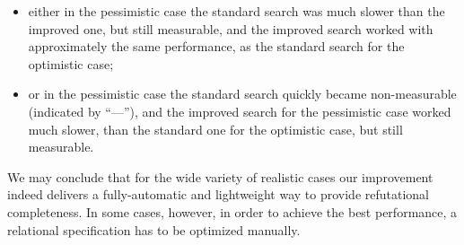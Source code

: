 \begin{itemize}
\item either in the pessimistic case the standard search was much slower than the improved one, but still measurable,
and the improved search worked with approximately the same performance, as the standard search for the optimistic case;
  
\item or in the pessimistic case the standard search quickly became non-measurable (indicated by ``---''), and the improved
search for the pessimistic case worked much slower, than the standard one for the optimistic case, but still measurable.
\end{itemize}

We may conclude that for the wide variety of realistic cases our improvement indeed delivers a fully-automatic and
lightweight way to provide refutational completeness. In some cases, however, in order to achieve the best performance,
a relational specification has to be optimized manually.
